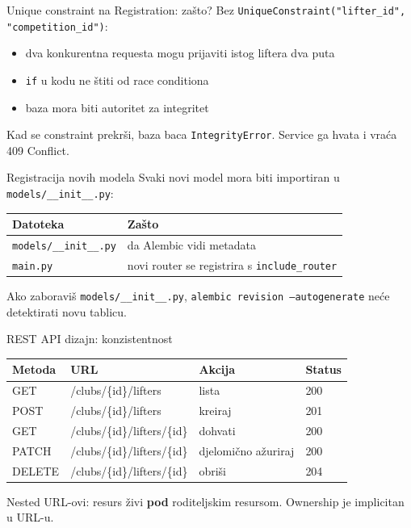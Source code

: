 \begin{frame}{Unique constraint na Registration: zašto?}
Bez \texttt{UniqueConstraint("lifter\_id", "competition\_id")}:
\begin{itemize}
  \item dva konkurentna requesta mogu prijaviti istog liftera dva puta
  \item \texttt{if} u kodu ne štiti od race conditiona
  \item baza mora biti autoritet za integritet
\end{itemize}

\vspace{0.6em}
Kad se constraint prekrši, baza baca \texttt{IntegrityError}. Service ga hvata i vraća 409 Conflict.
\end{frame}

\begin{frame}{Registracija novih modela}
Svaki novi model mora biti importiran u \texttt{models/\_\_init\_\_.py}:

\vspace{0.6em}
\begin{tabular}{@{}ll@{}}
  \toprule
  \textbf{Datoteka} & \textbf{Zašto} \\
  \midrule
  \texttt{models/\_\_init\_\_.py} & da Alembic vidi metadata \\
  \texttt{main.py} & novi router se registrira s \texttt{include\_router} \\
  \bottomrule
\end{tabular}

\vspace{0.6em}
Ako zaboraviš \texttt{models/\_\_init\_\_.py}, \texttt{alembic revision --autogenerate} neće detektirati novu tablicu.
\end{frame}

\begin{frame}{REST API dizajn: konzistentnost}
\begin{tabular}{@{}llll@{}}
  \toprule
  \textbf{Metoda} & \textbf{URL} & \textbf{Akcija} & \textbf{Status} \\
  \midrule
  GET & /clubs/\{id\}/lifters & lista & 200 \\
  POST & /clubs/\{id\}/lifters & kreiraj & 201 \\
  GET & /clubs/\{id\}/lifters/\{id\} & dohvati & 200 \\
  PATCH & /clubs/\{id\}/lifters/\{id\} & djelomično ažuriraj & 200 \\
  DELETE & /clubs/\{id\}/lifters/\{id\} & obriši & 204 \\
  \bottomrule
\end{tabular}

\vspace{0.6em}
Nested URL-ovi: resurs živi \textbf{pod} roditeljskim resursom. Ownership je implicitan u URL-u.
\end{frame}

